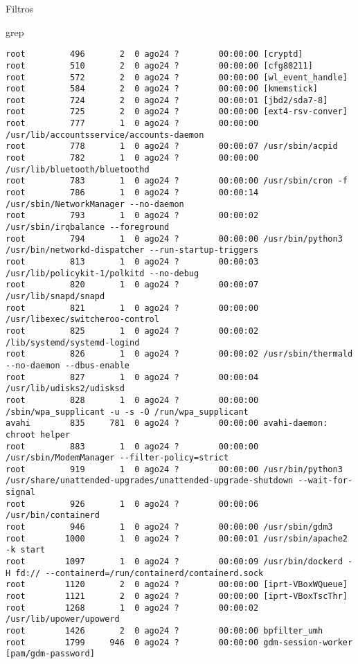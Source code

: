\begin{section}{Filtros}
\begin{subsection}{grep}
\begin{lstlisting}[style=Ubuntu]
root         496       2  0 ago24 ?        00:00:00 [cryptd]
root         510       2  0 ago24 ?        00:00:00 [cfg80211]
root         572       2  0 ago24 ?        00:00:00 [wl_event_handle]
root         584       2  0 ago24 ?        00:00:00 [kmemstick]
root         724       2  0 ago24 ?        00:00:01 [jbd2/sda7-8]
root         725       2  0 ago24 ?        00:00:00 [ext4-rsv-conver]
root         777       1  0 ago24 ?        00:00:00 /usr/lib/accountsservice/accounts-daemon
root         778       1  0 ago24 ?        00:00:07 /usr/sbin/acpid
root         782       1  0 ago24 ?        00:00:00 /usr/lib/bluetooth/bluetoothd
root         783       1  0 ago24 ?        00:00:00 /usr/sbin/cron -f
root         786       1  0 ago24 ?        00:00:14 /usr/sbin/NetworkManager --no-daemon
root         793       1  0 ago24 ?        00:00:02 /usr/sbin/irqbalance --foreground
root         794       1  0 ago24 ?        00:00:00 /usr/bin/python3 /usr/bin/networkd-dispatcher --run-startup-triggers
root         813       1  0 ago24 ?        00:00:03 /usr/lib/policykit-1/polkitd --no-debug
root         820       1  0 ago24 ?        00:00:07 /usr/lib/snapd/snapd
root         821       1  0 ago24 ?        00:00:00 /usr/libexec/switcheroo-control
root         825       1  0 ago24 ?        00:00:02 /lib/systemd/systemd-logind
root         826       1  0 ago24 ?        00:00:02 /usr/sbin/thermald --no-daemon --dbus-enable
root         827       1  0 ago24 ?        00:00:04 /usr/lib/udisks2/udisksd
root         828       1  0 ago24 ?        00:00:00 /sbin/wpa_supplicant -u -s -O /run/wpa_supplicant
avahi        835     781  0 ago24 ?        00:00:00 avahi-daemon: chroot helper
root         883       1  0 ago24 ?        00:00:00 /usr/sbin/ModemManager --filter-policy=strict
root         919       1  0 ago24 ?        00:00:00 /usr/bin/python3 /usr/share/unattended-upgrades/unattended-upgrade-shutdown --wait-for-signal
root         926       1  0 ago24 ?        00:00:06 /usr/bin/containerd
root         946       1  0 ago24 ?        00:00:00 /usr/sbin/gdm3
root        1000       1  0 ago24 ?        00:00:01 /usr/sbin/apache2 -k start
root        1097       1  0 ago24 ?        00:00:09 /usr/bin/dockerd -H fd:// --containerd=/run/containerd/containerd.sock
root        1120       2  0 ago24 ?        00:00:00 [iprt-VBoxWQueue]
root        1121       2  0 ago24 ?        00:00:00 [iprt-VBoxTscThr]
root        1268       1  0 ago24 ?        00:00:02 /usr/lib/upower/upowerd
root        1426       2  0 ago24 ?        00:00:00 bpfilter_umh
root        1799     946  0 ago24 ?        00:00:00 gdm-session-worker [pam/gdm-password]

\end{lstlisting}
\end{subsection}
\end{section}
